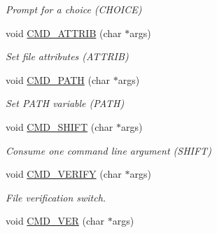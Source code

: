 \begin{DoxyCompactItemize}
\begin{DoxyCompactList}\small\item\em Prompt for a choice (C\-H\-O\-I\-C\-E) \end{DoxyCompactList}\item 
\hypertarget{classDOS__Shell_a98658a3e13ac8476c4c2bdd8b481de13}{void \hyperlink{classDOS__Shell_a98658a3e13ac8476c4c2bdd8b481de13}{C\-M\-D\-\_\-\-A\-T\-T\-R\-I\-B} (char $\ast$args)}\label{classDOS__Shell_a98658a3e13ac8476c4c2bdd8b481de13}

\begin{DoxyCompactList}\small\item\em Set file attributes (A\-T\-T\-R\-I\-B) \end{DoxyCompactList}\item 
\hypertarget{classDOS__Shell_a53558bb0585808e6f894f33fbb582058}{void \hyperlink{classDOS__Shell_a53558bb0585808e6f894f33fbb582058}{C\-M\-D\-\_\-\-P\-A\-T\-H} (char $\ast$args)}\label{classDOS__Shell_a53558bb0585808e6f894f33fbb582058}

\begin{DoxyCompactList}\small\item\em Set P\-A\-T\-H variable (P\-A\-T\-H) \end{DoxyCompactList}\item 
\hypertarget{classDOS__Shell_a44cd9147b18559ae2377e0255c4784e9}{void \hyperlink{classDOS__Shell_a44cd9147b18559ae2377e0255c4784e9}{C\-M\-D\-\_\-\-S\-H\-I\-F\-T} (char $\ast$args)}\label{classDOS__Shell_a44cd9147b18559ae2377e0255c4784e9}

\begin{DoxyCompactList}\small\item\em Consume one command line argument (S\-H\-I\-F\-T) \end{DoxyCompactList}\item 
\hypertarget{classDOS__Shell_a244d00897032e0be79baa4c850358079}{void \hyperlink{classDOS__Shell_a244d00897032e0be79baa4c850358079}{C\-M\-D\-\_\-\-V\-E\-R\-I\-F\-Y} (char $\ast$args)}\label{classDOS__Shell_a244d00897032e0be79baa4c850358079}

\begin{DoxyCompactList}\small\item\em File verification switch. \end{DoxyCompactList}\item 
\hypertarget{classDOS__Shell_ac9dfaa8312e2a2df60ba39cb1c4bd46a}{void \hyperlink{classDOS__Shell_ac9dfaa8312e2a2df60ba39cb1c4bd46a}{C\-M\-D\-\_\-\-V\-E\-R} (char $\ast$args)}\label{classDOS__Shell_ac9dfaa8312e2a2df60ba39cb1c4bd46a}


\end{DoxyCompactItemize}
